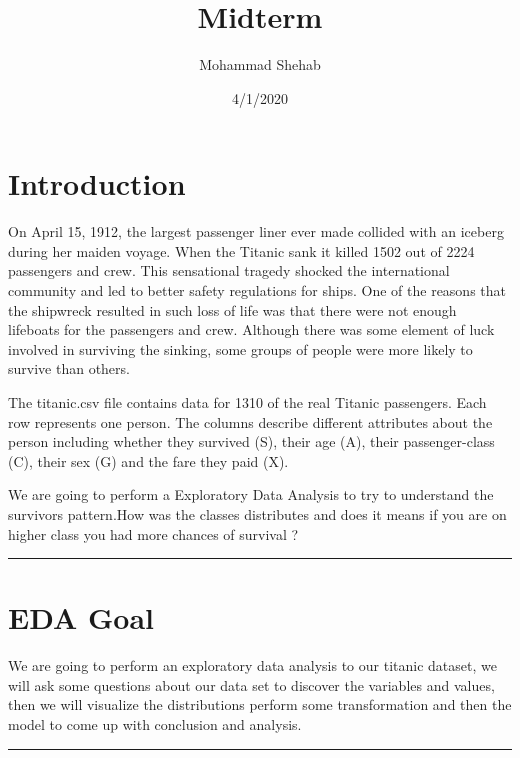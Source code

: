\documentclass[]{article}
\title{Midterm}
\author{Mohammad Shehab}
\date{4/1/2020}
\begin{document}
\maketitle

\hypertarget{introduction}{%
\section{Introduction}\label{introduction}}

On April 15, 1912, the largest passenger liner ever made collided with
an iceberg during her maiden voyage. When the Titanic sank it killed
1502 out of 2224 passengers and crew. This sensational tragedy shocked
the international community and led to better safety regulations for
ships. One of the reasons that the shipwreck resulted in such loss of
life was that there were not enough lifeboats for the passengers and
crew. Although there was some element of luck involved in surviving the
sinking, some groups of people were more likely to survive than others.

The titanic.csv file contains data for 1310 of the real Titanic
passengers. Each row represents one person. The columns describe
different attributes about the person including whether they survived
(S), their age (A), their passenger-class (C), their sex (G) and the
fare they paid (X).

We are going to perform a Exploratory Data Analysis to try to understand
the survivors pattern.How was the classes distributes and does it means
if you are on higher class you had more chances of survival ?

\begin{center}\rule{0.5\linewidth}{0.5pt}\end{center}

\hypertarget{eda-goal}{%
\section{EDA Goal}\label{eda-goal}}

We are going to perform an exploratory data analysis to our titanic
dataset, we will ask some questions about our data set to discover the
variables and values, then we will visualize the distributions perform
some transformation and then the model to come up with conclusion and
analysis.

\begin{center}\rule{0.5\linewidth}{0.5pt}\end{center}
\end{document}
